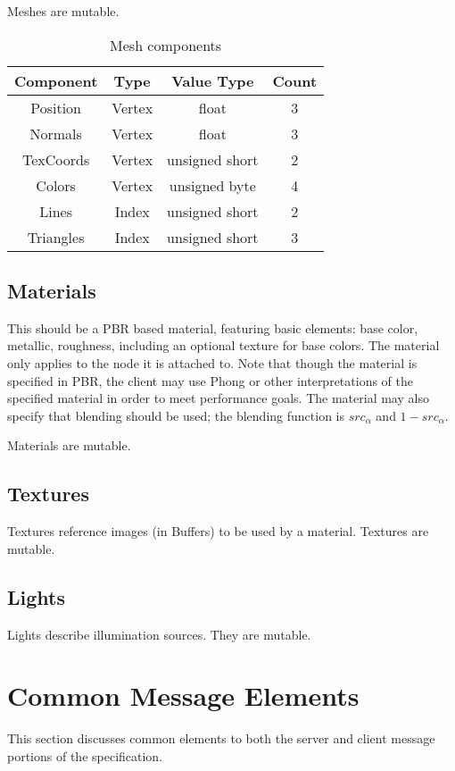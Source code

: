 \documentclass[11pt, oneside]{amsart}
\begin{document}
Meshes are mutable.

\begin{table}
	\begin{tabular}{cccc}
		\toprule
		\textbf{Component} & \textbf{Type} & \textbf{Value Type} & \textbf{Count} \\
		\midrule
		Position & Vertex & float & 3 \\
		Normals & Vertex & float & 3 \\
		TexCoords & Vertex & unsigned short & 2 \\
		Colors & Vertex & unsigned byte & 4 \\
		Lines & Index & unsigned short & 2 \\
		Triangles & Index & unsigned short & 3 \\
		\bottomrule
	\end{tabular}
	\caption{Mesh components}
	\label{tab:mesh_comp}
\end{table}

\subsection{Materials}
This should be a PBR based material, featuring basic elements: base color, metallic, roughness, including an optional texture for base colors. The material only applies to the node it is attached to. Note that though the material is specified in PBR, the client may use Phong or other interpretations of the specified material in order to meet performance goals. The material may also specify that blending should be used; the blending function is $src_{\alpha}$ and $1-src_{\alpha}$.

Materials are mutable.

\subsection{Textures}
Textures reference images (in Buffers) to be used by a material. Textures are mutable.

\subsection{Lights}
Lights describe illumination sources. They are mutable.

\section{Common Message Elements}
This section discusses common elements to both the server and client message portions of the specification.
\end{document}
